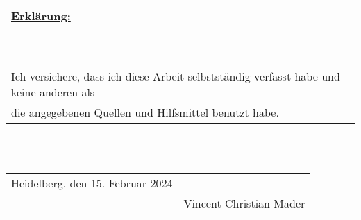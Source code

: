 \begin{titlepage}
    \ 
\end{titlepage}

\def\dotsign{\xleaders\hbox to .2em{\d{}}\hfill\d{}}

\begin{titlepage}
    \begin{tabular}{l}
        \textbf{\underline{Erklärung:}} \\
        \ \\
        \ \\
        Ich versichere, dass ich diese Arbeit selbstständig verfasst habe und keine anderen als \\ 
        die angegebenen Quellen und Hilfsmittel benutzt habe. \\
    \end{tabular}

        \ \\
        \ \\

    \begin{tabularx}{\textwidth}{l @{}p{10cm}@{}}
            Heidelberg, den 15. Februar 2024
        & 
            \hspace{10mm} \hrulefill 
        \\ 
        & 
            \hspace{10mm} Vincent Christian Mader 
    \end{tabularx}

\end{titlepage}
